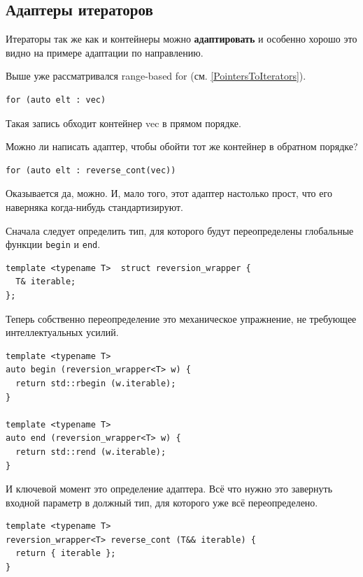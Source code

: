 \documentclass[a4paper,12pt,oneside]{book}
\begin{document}
\subsection{Адаптеры итераторов}\label{subsub:iteradapt}

Итераторы так же как и контейнеры можно \textbf{адаптировать} и особенно хорошо это видно на примере адаптации по направлению.

Выше уже рассматривался range-based for (см. \ref{PointersToIterators}).

\begin{lstlisting}
for (auto elt : vec)
\end{lstlisting}

Такая запись обходит контейнер vec в прямом порядке.

Можно ли написать адаптер, чтобы обойти тот же контейнер в обратном порядке?

\begin{lstlisting}
for (auto elt : reverse_cont(vec))
\end{lstlisting}

Оказывается да, можно. И, мало того, этот адаптер настолько прост, что его наверняка когда-нибудь стандартизируют.

Сначала следует определить тип, для которого будут переопределены глобальные функции \lstinline!begin! и \lstinline!end!.

\begin{lstlisting}
template <typename T>  struct reversion_wrapper {
  T& iterable;
};
\end{lstlisting}

Теперь собственно переопределение это механическое упражнение, не требующее интеллектуальных усилий.

\begin{lstlisting}
template <typename T> 
auto begin (reversion_wrapper<T> w) {
  return std::rbegin (w.iterable); 
}

template <typename T> 
auto end (reversion_wrapper<T> w) {
  return std::rend (w.iterable); 
}
\end{lstlisting}

И ключевой момент это определение адаптера. Всё что нужно это завернуть входной параметр в должный тип, для которого уже всё переопределено.

\begin{lstlisting}
template <typename T> 
reversion_wrapper<T> reverse_cont (T&& iterable) {
  return { iterable };
}
\end{lstlisting}
\end{document}
